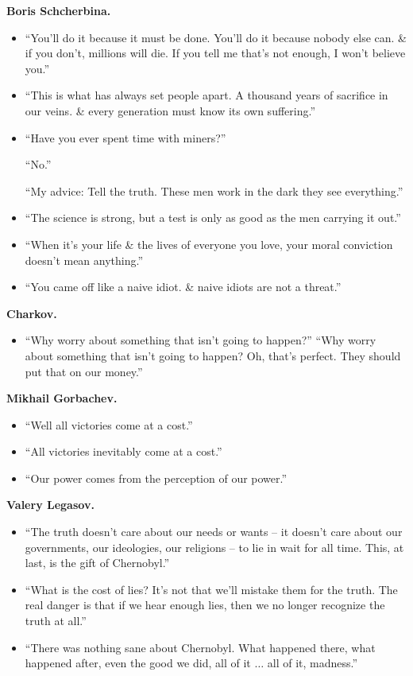 \documentclass{article}
\begin{document}
\begin{enumerate}
	\textbf{Boris Schcherbina.}
	\begin{itemize}
		\item ``You'll do it because it must be done. You'll do it because nobody else can. \& if you don't, millions will die. If you tell me that's not enough, I won't believe you.''
		\item ``This is what has always set people apart. A thousand years of sacrifice in our veins. \& every generation must know its own suffering.''
		\item ``Have you ever spent time with miners?''
		
		``No.''
		
		``My advice: Tell the truth. These men work in the dark they see everything.''
		\item ``The science is strong, but a test is only as good as the men carrying it out.''
		\item ``When it's your life \& the lives of everyone you love, your moral conviction doesn't mean anything.''
		\item ``You came off like a naive idiot. \& naive idiots are not a threat.''
	\end{itemize}
	\textbf{Charkov.}
	\begin{itemize}
		\item ``Why worry about something that isn't going to happen?'' ``Why worry about something that isn't going to happen? Oh, that's perfect. They should put that on our money.''
	\end{itemize}
	\textbf{Mikhail Gorbachev.}
	\begin{itemize}
		\item ``Well all victories come at a cost.''
		\item ``All victories inevitably come at a cost.''
		\item ``Our power comes from the perception of our power.''
	\end{itemize}
	\textbf{Valery Legasov.}
	\begin{itemize}
		\item ``The truth doesn't care about our needs or wants -- it doesn't care about our governments, our ideologies, our religions -- to lie in wait for all time. This, at last, is the gift of Chernobyl.''
		\item ``What is the cost of lies? It's not that we'll mistake them for the truth. The real danger is that if we hear enough lies, then we no longer recognize the truth at all.''
		\item ``There was nothing sane about Chernobyl. What happened there, what happened after, even the good we did, all of it $\ldots$ all of it, madness.''

\end{itemize}
\end{enumerate}
\end{document}
